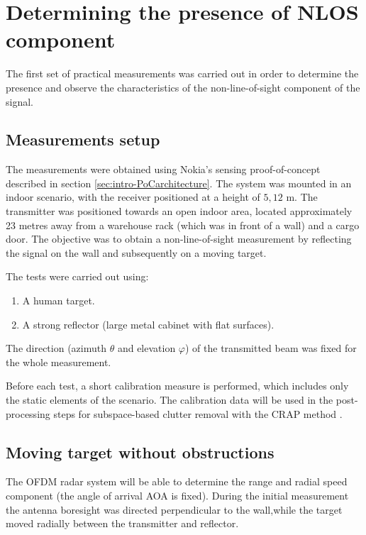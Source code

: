 \chapter{Determining the presence of NLOS component}

The first set of practical measurements was carried out in order to determine the presence and observe the characteristics of the non-line-of-sight component of the signal. 

\section{Measurements setup}

The measurements were obtained using Nokia's sensing proof-of-concept described in section \ref{sec:intro-PoCarchitecture}. The system was mounted in an indoor scenario, with the receiver positioned at a height of $5,12$ m. The transmitter was positioned towards an open indoor area, located approximately 23 metres away from a warehouse rack (which was in front of a wall) and a cargo door.
The objective was to obtain a non-line-of-sight measurement by reflecting the signal on the wall and subsequently on a moving target. 

The tests were carried out using:

\begin{enumerate}
	\item A human target.
	\item A strong reflector (large metal cabinet with flat surfaces).
\end{enumerate}

The direction (azimuth $\theta$ and elevation $\varphi$) of the transmitted beam was fixed for the whole measurement.

Before each test, a short calibration measure is performed, which includes only the static elements of the scenario. The calibration data will be used in the post-processing steps for subspace-based clutter removal with the CRAP method  \cite{Henninger_Mandelli_Grudnitsky_Wild_Brink_2023}. 

\section{Moving target without obstructions}

The OFDM radar system will be able to determine the range and radial speed component (the angle of arrival AOA is fixed). During the initial measurement the antenna boresight was directed perpendicular to the wall,while the target moved radially between the transmitter and reflector.

